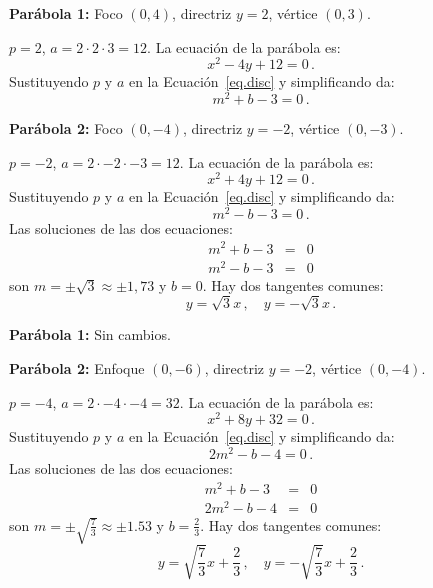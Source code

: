 \begin{example}\mbox{}

\noindent\textbf{Parábola 1:} Foco $(0,4)$, directriz $y=2$, vértice $(0,3)$.

\noindent{}$p=2$, $a=2\cdot 2\cdot 3=12$. La ecuación de la parábola es:
\[
x^2-4y +12=0\,.
\]
Sustituyendo $p$ y $a$ en la Ecuación~\ref{eq.disc} y simplificando da:
\[
m^2+b-3=0\,.
\]

\noindent\textbf{Parábola 2:} Foco $(0,-4)$, directriz $y=-2$, vértice $(0,-3)$.

\noindent{}$p=-2$, $a=2\cdot -2\cdot -3=12$. La ecuación de la parábola es:
\[
x^2+4y+12=0\,.
\]
Sustituyendo $p$ y $a$ en la Ecuación~\ref{eq.disc} y simplificando da:
\[
m^2-b-3=0\,.
\]
Las soluciones de las dos ecuaciones:
\begin{eqnarray*}
m^2+b-3&=&0\\
m^2-b-3&=&0
\end{eqnarray*}
son $m=\pm\sqrt{3}\approx \pm 1,73$ y $b=0$. Hay dos tangentes comunes:
\[
y=\sqrt{3}x\,,\quad y=-\sqrt{3}x\,.
\]
\end{example}

\begin{example}\mbox{}

\noindent\textbf{Parábola 1:}
Sin cambios.

\noindent\textbf{Parábola 2:} Enfoque $(0,-6)$, directriz $y=-2$, vértice $(0,-4)$.

\noindent{}$p=-4$, $a=2\cdot -4\cdot -4=32$. La ecuación de la parábola es:
\[
x^2+8y +32=0\,.
\]
Sustituyendo $p$ y $a$ en la Ecuación~\ref{eq.disc} y simplificando da:
\[
2m^2-b-4=0\,.
\]
Las soluciones de las dos ecuaciones:
\begin{eqnarray*}
m^2+b-3&=&0\\
2m^2-b-4&=&0
\end{eqnarray*}
son $m=\pm\sqrt{\displaystyle\frac{7}{3}}\approx \pm 1.53$ y $b=\displaystyle\frac{2}{3}$. Hay dos tangentes comunes:
\[
y=\sqrt{\frac{7}{3}}x+\frac{2}{3}\,,\quad y=-\sqrt{\frac{7}{3}}x+\frac{2}{3}\,.
\]
\end{example}


